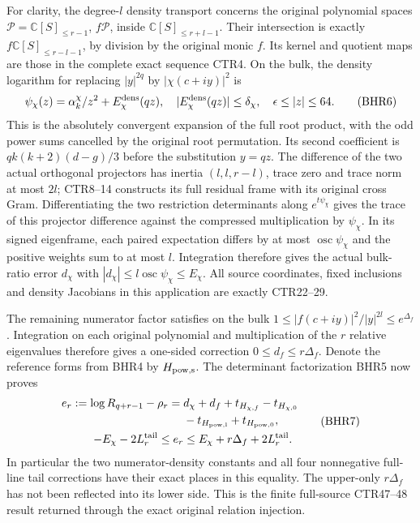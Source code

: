 \documentclass[11pt,a4paper]{article}
\newcommand{\C}{\mathbb C}
\begin{document}
For clarity, the degree-$l$ density transport concerns the
original polynomial spaces $\mathcal P=\C[S]_{\leq r-1}$,
$f\mathcal P$, inside $\C[S]_{\leq r+l-1}$.
Their intersection is exactly
$f\C[S]_{\leq r-l-1}$, by division by the original
monic $f$. Its kernel and quotient maps are those in
the complete exact sequence CTR4.
On the bulk, the density logarithm for replacing
$|y|^{2q}$ by $|\chi(c+iy)|^2$ is
\[
 \psi_\chi(z)=\alpha_k^\chi/z^2+E_\chi^{\rm dens}(qz),
 \quad |E_\chi^{\rm dens}(qz)|\leq\delta_\chi,
 \quad\epsilon\leq|z|\leq64.
 \tag{BHR6}
\]
This is the absolutely convergent expansion of the full
root product, with the odd power sums cancelled by the
original root permutation. Its second coefficient is
$qk(k+2)(d-g)/3$ before the substitution $y=qz$.
The difference of the two actual orthogonal projectors
has inertia $(l,l,r-l)$, trace zero and trace norm at
most $2l$; CTR8--14 constructs its full residual frame
with its original cross Gram. Differentiating the two
restriction determinants along $e^{t\psi_\chi}$ gives
the trace of this projector difference against the
compressed multiplication by $\psi_\chi$. In its signed
eigenframe, each paired expectation differs by at most
$\operatorname{osc}\psi_\chi$ and the positive weights
sum to at most $l$. Integration therefore gives the
actual bulk-ratio error $d_\chi$ with
$|d_\chi|\leq l\operatorname{osc}\psi_\chi\leq E_\chi$.
All source coordinates, fixed inclusions and density
Jacobians in this application are exactly CTR22--29.

The remaining numerator factor satisfies on the bulk
$1\leq|f(c+iy)|^2/|y|^{2l}\leq e^{\Delta_f}$.
Integration on each original polynomial and multiplication
of the $r$ relative eigenvalues therefore gives a
one-sided correction $0\leq d_f\leq r\Delta_f$.
Denote the reference forms from BHR4 by $H_{\rm pow,s}$.
The determinant factorization BHR5 now proves
\[
\begin{aligned}
 e_r:=\log R_{q+r-1}-\rho_r
 ={}&d_\chi+d_f+t_{H_{\chi,f}}-t_{H_{\chi,0}}\\
    &-t_{H_{\rm pow,l}}+t_{H_{\rm pow,0}},\\
 -E_\chi-2L_r^{\rm tail}\leq e_r
 &\leq E_\chi+r\Delta_f+2L_r^{\rm tail}.
\end{aligned}\tag{BHR7}
\]
In particular the two numerator-density constants and all
four nonnegative full-line tail corrections have their
exact places in this equality. The upper-only
$r\Delta_f$ has not been reflected into its lower side.
This is the finite full-source CTR47--48 result returned
through the exact original relation injection.
\end{document}
